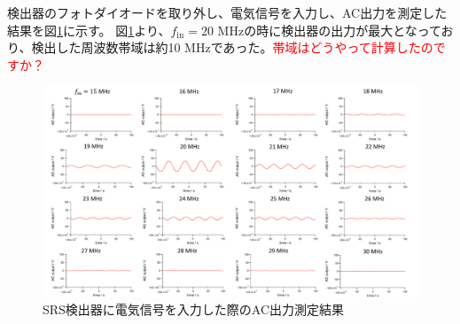\documentclass[uplatex,a4paper]{jsarticle}
\begin{document}
検出器のフォトダイオードを取り外し、電気信号を入力し、AC出力を測定した結果を図\ref{fig:DetectorTest_FG}に示す。
図\ref{fig:DetectorTest_FG}より、$f_{\mathrm{in}}=20$ MHzの時に検出器の出力が最大となっており、検出した周波数帯域は約10 MHzであった。\textcolor{red}{帯域はどうやって計算したのですか？}

\begin{figure}[H]
	\centering
	\includegraphics[width=15cm]{figure/3_7_detectorTest_FG.pdf}
	\caption{SRS検出器に電気信号を入力した際のAC出力測定結果	\label{fig:DetectorTest_FG}}
\end{figure}

 
\end{document}
